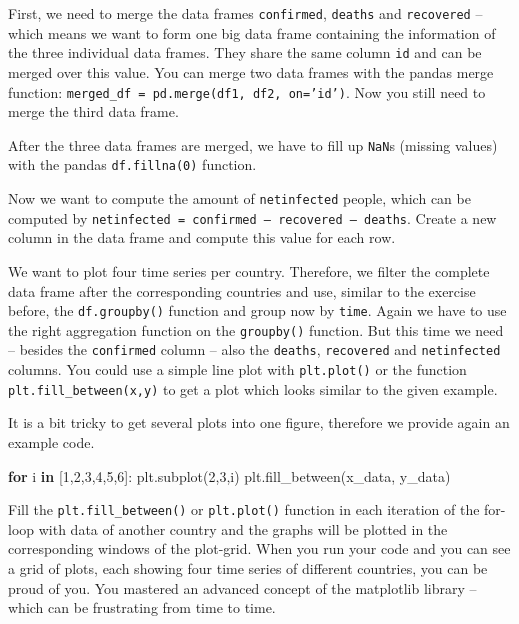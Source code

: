 \documentclass[
  11pt,
]{article}
\newenvironment{Shaded}{\begin{snugshade}}{\end{snugshade}}
\newcommand{\ControlFlowTok}[1]{\textcolor[rgb]{0.13,0.29,0.53}{\textbf{#1}}}
\newcommand{\DecValTok}[1]{\textcolor[rgb]{0.00,0.00,0.81}{#1}}
\newcommand{\KeywordTok}[1]{\textcolor[rgb]{0.13,0.29,0.53}{\textbf{#1}}}
\newcommand{\NormalTok}[1]{#1}
\newenvironment{tipsp}[1]
  {
  \begin{itemize}
  \footnotesize
  \renewcommand{\labelitemi}{
    \raisebox{-.7\height}[0pt][0pt]{
      {\setkeys{Gin}{width=3em,keepaspectratio}
        \texttt{[image: images/\#1.png]}}
    }
  }
  \setlength{\fboxsep}{1em}
  \begin{pbox}
  \item
  }
  {
  \end{pbox}
  \end{itemize}
  }
\begin{document}
\begin{tipsp}p

First, we need to merge the data frames \texttt{confirmed}, \texttt{deaths} and \texttt{recovered} -- which means we want to form one big data frame containing the information of the three individual data frames. They share the same column \texttt{id} and can be merged over this value. You can merge two data frames with the pandas merge function: \texttt{merged\_df\ =\ pd.merge(df1,\ df2,\ on=’id’)}. Now you still need to merge the third data frame.

After the three data frames are merged, we have to fill up \texttt{NaN}s (missing values) with the pandas \texttt{df.fillna(0)} function.

Now we want to compute the amount of \texttt{netinfected} people, which can be computed by \texttt{netinfected\ =\ confirmed\ –\ recovered\ –\ deaths}. Create a new column in the data frame and compute this value for each row.

We want to plot four time series per country. Therefore, we filter the complete data frame after the corresponding countries and use, similar to the exercise before, the \texttt{df.groupby()} function and group now by \texttt{time}. Again we have to use the right aggregation function on the \texttt{groupby()} function. But this time we need -- besides the \texttt{confirmed} column -- also the \texttt{deaths}, \texttt{recovered} and \texttt{netinfected} columns. You could use a simple line plot with \texttt{plt.plot()} or the function \texttt{plt.fill\_between(x,y)} to get a plot which looks similar to the given example.

It is a bit tricky to get several plots into one figure, therefore we provide again an example code.

\begin{Shaded}
\begin{Highlighting}[]
\ControlFlowTok{for}\NormalTok{ i }\KeywordTok{in}\NormalTok{ [}\DecValTok{1}\NormalTok{,}\DecValTok{2}\NormalTok{,}\DecValTok{3}\NormalTok{,}\DecValTok{4}\NormalTok{,}\DecValTok{5}\NormalTok{,}\DecValTok{6}\NormalTok{]:}
\NormalTok{    plt.subplot(}\DecValTok{2}\NormalTok{,}\DecValTok{3}\NormalTok{,i)}
\NormalTok{    plt.fill\_between(x\_data, y\_data)}
\end{Highlighting}
\end{Shaded}

Fill the \texttt{plt.fill\_between()} or \texttt{plt.plot()} function in each iteration of the for-loop with data of another country and the graphs will be plotted in the corresponding windows of the plot-grid.
When you run your code and you can see a grid of plots, each showing four time series of different countries, you can be proud of you. You mastered an advanced concept of the matplotlib library -- which can be frustrating from time to time.


\end{tipsp}
\end{document}
